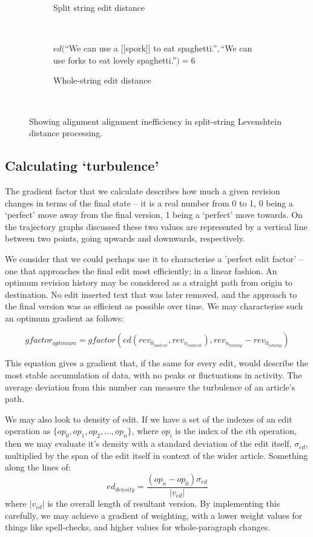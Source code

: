 \begin{figure}[p]
\begin{subfigure}[t]{\linewidth}
\begin{tikzpicture}
    \end{tikzpicture}
    \caption{Split string edit distance}
  \end{subfigure}\\
  \vspace{20mm}
  \begin{subfigure}[t]{\linewidth}
    $ed($``We can use a [[spork]] to eat spaghetti.''$,$``We can use forks
    to eat lovely spaghetti.''$) = 6$
    \caption{Whole-string edit distance}
  \end{subfigure}\\
  \vspace{20mm}
  \caption{Showing alignment alignment inefficiency in split-string
    Levenshtein distance processing.}
\label{fig:split-string-problem}
\end{figure}

\subsection*{Calculating `turbulence'}
The gradient factor that we calculate describes how much a given
revision changes in terms of the final state -- it is a real number
from 0 to 1, 0 being a `perfect' move away from the final version, 1
being a `perfect' move towards. On the trajectory graphs discussed
these two values are represented by a vertical line between two
points, going upwards and downwards, respectively.

We consider that we could perhaps use it to characterise a 'perfect
edit factor' -- one that approaches the final edit most efficiently; in a
linear fashion. An optimum revision history may be considered as a
straight path from origin to destination. No edit inserted text that
was later removed, and the approach to the final version was as
efficient as possible over time. We may characterise such an optimum
gradient as follows:

\[
  gfactor_{optimum} = gfactor(ed(rev_{0_{content}},
  rev_{n_{content}}), rev_{n_{tstamp}} - rev_{0_{tstamp}})
\]

This equation gives a gradient that, if the same for every edit, would
describe the most stable accumulation of data, with no peaks or
fluctuations in activity. The average deviation from this number can
measure the turbulence of an article's path. 

We may also look to density of edit. If we have a set of the indexes
of an edit operation as $\{op_0,op_1,op_2,\dots, op_n\}$, where $op_i$
is the index of the $i$th operation, then we may evaluate it's density
with a standard deviation of the edit itself, $\sigma_{ed}$,
multiplied by the span of the edit itself in context of the wider
article. Something along the lines of:
$$ed_{density} = \frac{(op_n - op_0)\sigma_{ed}}{|v_{ed}|}$$ where
$|v_{ed}|$ is the overall length of resultant version. By implementing
this carefully, we may achieve a gradient of weighting, with a lower
weight values for things like spell-checks, and higher values for
whole-paragraph changes.

